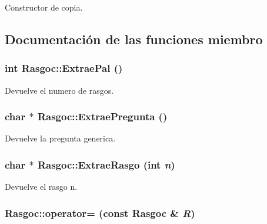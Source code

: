Constructor de copia. 



\subsection{Documentación de las funciones miembro}
\hypertarget{class_rasgoc_35dce951c99831bc19ea25a2e768dff6}{
\subsubsection[{ExtraePal}]{\setlength{\rightskip}{0pt plus 5cm}int Rasgoc::ExtraePal ()}}
\label{class_rasgoc_35dce951c99831bc19ea25a2e768dff6}


Devuelve el numero de rasgos. 

\hypertarget{class_rasgoc_d26f42e7cb5d2b59e8b46db90710f105}{
\subsubsection[{ExtraePregunta}]{\setlength{\rightskip}{0pt plus 5cm}char $\ast$ Rasgoc::ExtraePregunta ()}}
\label{class_rasgoc_d26f42e7cb5d2b59e8b46db90710f105}


Devuelve la pregunta generica. 

\hypertarget{class_rasgoc_79b6809cdeb33acdc895c0e6afe5edc1}{
\subsubsection[{ExtraeRasgo}]{\setlength{\rightskip}{0pt plus 5cm}char $\ast$ Rasgoc::ExtraeRasgo (int {\em n})}}
\label{class_rasgoc_79b6809cdeb33acdc895c0e6afe5edc1}


Devuelve el rasgo n. 

\hypertarget{class_rasgoc_f22e8b0f99cf942a698b80e058d6b56a}{
\subsubsection[{operator=}]{ Rasgoc::operator= (const {\bf Rasgoc} \& {\em R})}}
\label{class_rasgoc_f22e8b0f99cf942a698b80e058d6b56a}


